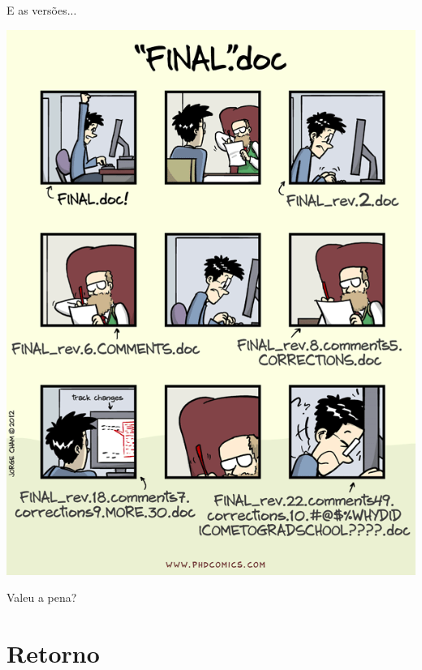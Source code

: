 \documentclass{beamer}
\begin{document}
\begin{frame}{E as versões...}
  \begin{center}
    \includegraphics[height=.75\textheight]{Encerramento/phdcomics-revisoes}

    \vfill
  \end{center}
\end{frame}

\begin{frame}
  \begin{center}
    Valeu a pena?

    \vfill
  \end{center}
\end{frame}

\section{Retorno}
\end{document}
